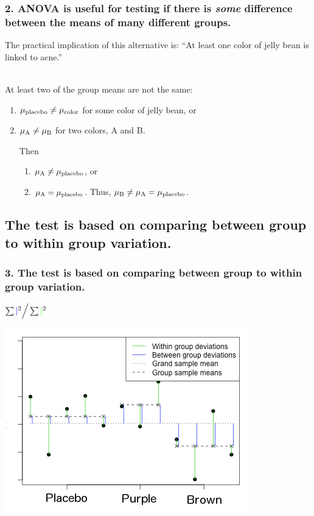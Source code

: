 \documentclass[slidestop,compress,mathserif,12pt,t,professionalfonts,xcolor=table]{beamer}
\newcommand{\mainideaB}{ANOVA is useful for testing if there is \emph{some} difference
  between the means of many different groups.}
\newcommand{\mainideaC}{The test is based on comparing between group to within group variation.}
\begin{document}

\begin{frame}
  \frametitle{2. \mainideaB}

The practical implication of this alternative is: ``At least one color of
jelly bean is linked to acne.''

\pause

\hfill \\

At least two of the group means are not the same: \pause
\begin{enumerate}
\item $\mu_{\textmd{placebo}} \neq \mu_{\textmd{color}}$ for some color of jelly
  bean, or \pause
\item $\mu_{\textmd{A}} \neq \mu_{\textmd{B}}$ for two colors, A and B. \pause

\vspace{6pt}

Then 

\vspace{3pt}

\begin{enumerate}
\item $\mu_{\textmd{A}} \neq \mu_{\textmd{placebo}}$, or \pause

\item $\mu_{\textmd{A}} = \mu_{\textmd{placebo}}$.  Thus, $\mu_{\textmd{B}} \neq
  \mu_{\textmd{A}} = \mu_{\textmd{placebo}}$.
\end{enumerate}

\end{enumerate}

\end{frame}


\subsection{\mainideaC}
\label{mi3}


\begin{frame}
  \frametitle{3. \mainideaC}

\centering
\(
\sum {\color{blue} \mid}^2 \Big/ \sum {\color{green} \mid}^2
\)

  \includegraphics[scale=0.6]{figures/anova-middle-ground-jelly-bean.png}

\end{frame}
\end{document}
